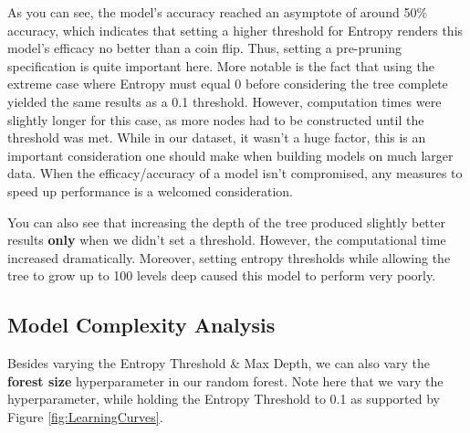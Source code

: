 \documentclass[letterpaper,12pt]{article}
\begin{document}
As you can see, the model's accuracy reached an asymptote of around 50\% accuracy, which indicates that setting a higher threshold for Entropy renders this model's efficacy no better than a coin flip.  Thus, setting a pre-pruning specification is quite important here.  More notable is the fact that using the extreme case where Entropy must equal 0 before considering the tree complete yielded the same results as a 0.1 threshold.  However, computation times were slightly longer for this case, as more nodes had to be constructed until the threshold was met.  While in our dataset, it wasn't a huge factor, this is an important consideration one should make when building models on much larger data.  When the efficacy/accuracy of a model isn't compromised, any measures to speed up performance is a welcomed consideration.

You can also see that increasing the depth of the tree produced slightly better results \textbf{only} when we didn't set a threshold.  However, the computational time increased dramatically.  Moreover, setting entropy thresholds while allowing the tree to grow up to 100 levels deep caused this model to perform very poorly.

\subsection{Model Complexity Analysis}
Besides varying the Entropy Threshold \& Max Depth, we can also vary the \textbf{forest size} hyperparameter in our random forest.  Note here that we vary the hyperparameter, while holding the Entropy Threshold to 0.1 as supported by Figure \ref{fig:LearningCurves}.
\end{document}
